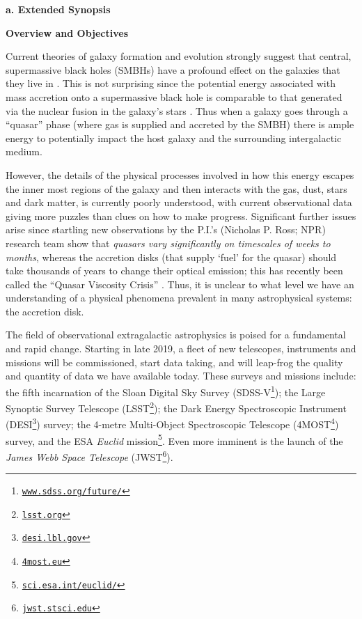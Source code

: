\documentclass[oneside, a4paper, onecolumn, 11pt]{article}
\begin{document}
\smallskip
\smallskip
\noindent
{\bf{\textcolor{Cerulean}{a. Extended Synopsis}}} 
\vspace{6pt}

\noindent
\large
{\bf{\textcolor{Cerulean}{Overview and Objectives}}}
\normalsize

\smallskip
\noindent
Current theories of galaxy formation and evolution strongly suggest that central, supermassive black holes (SMBHs) have a profound effect on the galaxies that they live in 
\citep{Vogelsberger2014Nature, Schaye2015, SomervilleDave2015,Dave2017}. 
This is not surprising since the potential energy associated with mass accretion onto a supermassive black hole is comparable to that generated via the nuclear fusion in the galaxy's stars \citep[see e.g. ][]{Fabian2012}. Thus when a galaxy goes through a ``quasar'' phase (where gas is supplied and accreted by the SMBH) there is ample energy to potentially impact the host galaxy 
and the surrounding intergalactic medium. 

\smallskip
\smallskip
\noindent
However, the details of the physical processes involved in how this energy escapes the inner most regions of the galaxy and then interacts with the gas, dust, stars and dark matter, is currently poorly understood, with current observational data giving more puzzles than clues on how to make progress. Significant further issues arise since startling new observations by the P.I.’s (Nicholas P. Ross; NPR) research team \citep{MacLeod2016, Ross2018} show that {\it quasars vary significantly on timescales of weeks to months}, whereas the accretion disks (that supply `fuel' for the quasar) should take thousands of years to change their optical emission; this has recently been called the ``Quasar Viscosity Crisis''  \citep[e.g., ][]{Lawrence2018}. Thus, it is unclear to what level we have an understanding of a physical phenomena prevalent in many astrophysical systems: the accretion disk. 

\smallskip
\smallskip
\noindent
The field of observational extragalactic astrophysics is poised for a fundamental and rapid change. Starting in late 2019, a fleet of new telescopes, instruments and missions will be commissioned, start data taking, and will leap-frog the quality and quantity of data we have available today. These surveys and missions include: the fifth incarnation of the Sloan Digital Sky Survey (SDSS-V\footnote{\href{www.sdss.org/future/}{{\tt www.sdss.org/future/}}}); the Large Synoptic Survey Telescope (LSST\footnote{\href{lsst.org}{{\tt lsst.org}}}); the Dark Energy Spectroscopic Instrument (DESI\footnote{\href{desi.lbl.gov}{{\tt desi.lbl.gov}}}) survey; the 4-metre Multi-Object Spectroscopic Telescope (4MOST\footnote{\href{4most.eu}{{\tt 4most.eu}}}) survey, and the ESA {\it Euclid} mission\footnote{\href{sci.esa.int/euclid/}{{\tt sci.esa.int/euclid/}}}. Even more imminent is the launch of the {\it James Webb Space Telescope} (JWST\footnote{\href{jwst.stsci.edu}{{\tt jwst.stsci.edu}}}).
\end{document}
